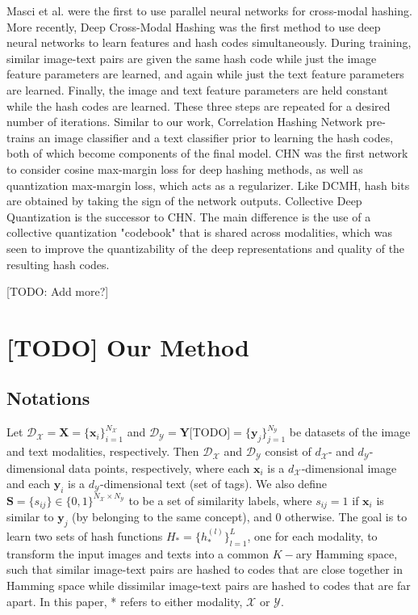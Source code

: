 \documentclass[letterpaper]{article}
\newcommand{\X}{\mathbf{X}}
\newcommand{\Y}{\mathbf{Y}}
\newcommand{\xii}{\mathbf{x}_i}
\newcommand{\yj}{\mathbf{y}_j}
\begin{document}
Masci et al. \cite{masci} were the first to use parallel neural networks for cross-modal hashing. More recently, Deep Cross-Modal Hashing \cite{dcmh} was the first method to use deep neural networks to learn features and hash codes simultaneously. During training, similar image-text pairs are given the same hash code while just the image feature parameters are learned, and again while just the text feature parameters are learned. Finally, the image and text feature parameters are held constant while the hash codes are learned. These three steps are repeated for a desired number of iterations. Similar to our work, Correlation Hashing Network \cite{chn} pre-trains an image classifier and a text classifier prior to learning the hash codes, both of which become components of the final model. CHN was the first network to consider cosine max-margin loss for deep hashing methods, as well as quantization max-margin loss, which acts as a regularizer. Like DCMH, hash bits are obtained by taking the sign of the network outputs. Collective Deep Quantization \cite {cdq} is the successor to CHN. The main difference is the use of a collective quantization "codebook" that is shared across modalities, which was seen to improve the quantizability of the deep representations and quality of the resulting hash codes.

[TODO: Add more?]

\section{[TODO] Our Method}

\subsection{Notations}

Let $ \mathcal{D}_\mathcal{X} = \X = \{ \xii \}_{i=1}^{N_\mathcal{X}} $ and $ \mathcal{D}_\mathcal{Y} = \Y \text{[TODO]} = \{ \yj \}_{j=1}^{N_\mathcal{Y}} $ be datasets of the image and text modalities, respectively. Then $ \mathcal{D}_\mathcal{X} $ and $ \mathcal{D}_\mathcal{Y} $ consist of $ d_\mathcal{X} $- and $ d_\mathcal{Y} $-dimensional data points, respectively, where each $ \xii $ is a $ d_\mathcal{X} $-dimensional image and each $ \mathbf{y}_i $ is a $ d_\mathcal{Y} $-dimensional text (set of tags). We also define $ \mathbf{S} = \{s_{ij}\} \in \{0,1\}^{N_\mathcal{X} \times N_\mathcal{Y}} $ to be a set of similarity labels, where $ s_{ij} = 1 $ if $ \xii $ is similar to $ \yj $ (by belonging to the same concept), and $ 0 $ otherwise. The goal is to learn two sets of hash functions $ H_* = \{h_*^{(l)}\}_{l=1}^L $, one for each modality, to transform the input images and texts into a common $K-$ary Hamming space, such that similar image-text pairs are hashed to codes that are close together in Hamming space while dissimilar image-text pairs are hashed to codes that are far apart. In this paper, * refers to either modality, $ \mathcal{X} $ or $ \mathcal{Y} $.
\end{document}
